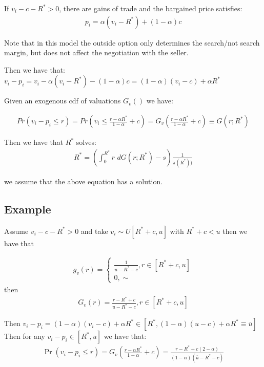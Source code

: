 \documentclass[12pt]{article}
\theoremstyle{plain}
\theoremstyle{plain}
\begin{document}
If $v_i - c- R^*> 0$, there are gains of trade and the bargained price satisfies: 
\begin{align}\label{eq:bargained_prices}
    p_i=\alpha (v_i - R^*)+ (1-\alpha)c 
\end{align}


Note that in this model the outside option only determines the search/not search margin, but does not affect the negotiation with the seller. 

Then we have that: 
$v_i - p_i = v_i - \alpha (v_i - R^*)- (1-\alpha)c  = (1-\alpha)(v_i -c) +\alpha R^*$

Given an exogenous cdf of valuations $G_v()$ we have: 

\begin{align*}
    Pr(v_i-p_i\leq r) = Pr\left(v_i \leq \frac{r-\alpha R^*}{1-\alpha}+c\right)= G_v\left( \frac{r-\alpha R^*}{1-\alpha}+c\right) \equiv G(r; R^*)
\end{align*}


Then we have that $R^*$ solves: 
\begin{align}\label{eq:reservation_utility2}
        R^* = \left( \int_0^{R^*} r \, \, dG(r; R^*) -s\right)\frac{1}{\pi(R^*))} 
\end{align}

we assume that the above equation has a solution.


\subsection{Example}

Assume $v_i - c - R^*>0$ and take $v_i \sim U[R^*+c, u]$ with $R^*+c< u$ then we have that 

\begin{align}
    g_v(r) = 
    \begin{cases}
        \frac{1}{u-R^*-c}, r\in [R^*+c, u]\\ 
        0, \sim 
    \end{cases}
\end{align}
then
\begin{align}
    G_v(r) =  
        \frac{r-R^*+c}{u-R^*-c}, r\in [R^*+c, u]
\end{align}

Then $v_i - p_i = (1-\alpha)(v_i -c) +\alpha R^* \in [R^*, (1-\alpha)(u-c)+ \alpha R^*  \equiv \bar{u}] $
Then for any $v_i - p_i  \in [R^*, \bar{u}] $ we have that: 
\begin{align}
    \Pr(v_i - p_i\leq r) = G_v\left(\frac{r-\alpha R^*}{1-\alpha} +c\right) = \frac{r-R^*+c(2-\alpha)}{(1-\alpha)(\bar{u}-R^*-c)}
\end{align}
\end{document}
